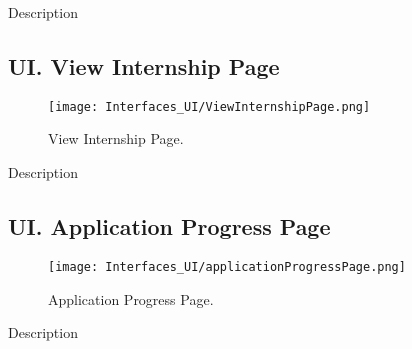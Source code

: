 Description

\subsection*{UI\cui . View Internship Page}

\begin{figure}[H]
    \begin{center}
        \texttt{[image: Interfaces\_UI/ViewInternshipPage.png]}
        \caption{View Internship Page.}
        \label{fig:view_internship_page}%
    \end{center}
\end{figure}

Description

\subsection*{UI\cui . Application Progress Page}

\begin{figure}[H]
    \begin{center}
        \texttt{[image: Interfaces\_UI/applicationProgressPage.png]}
        \caption{Application Progress Page.}
        \label{fig:application_progress_page}%
    \end{center}   
\end{figure}

Description 




